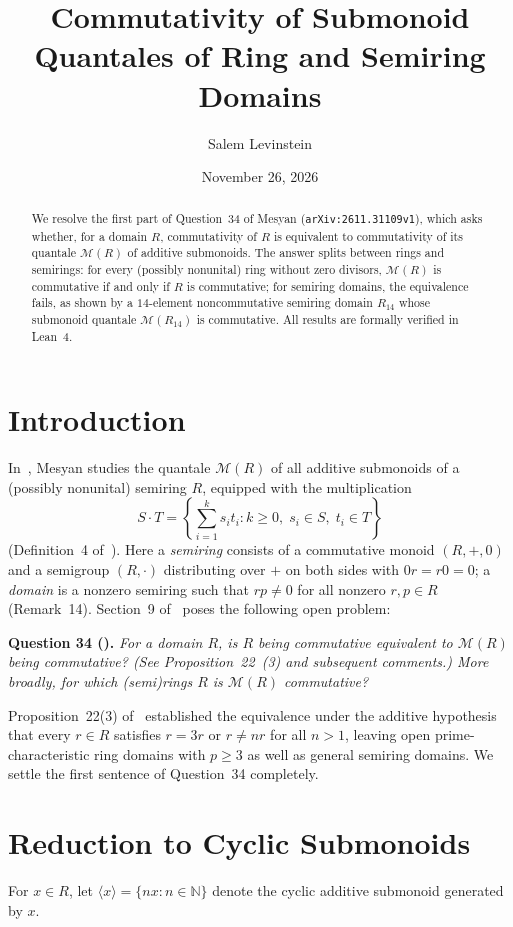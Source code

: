 \documentclass[11pt]{article}
\title{Commutativity of Submonoid Quantales of Ring and Semiring Domains}
\author{Salem Levinstein}
\date{November 26, 2026}
\theoremstyle{remark}
\begin{document}
\maketitle

\begin{abstract}
We resolve the first part of Question~34 of Mesyan (\texttt{arXiv:2611.31109v1}), which asks whether, for a domain $R$, commutativity of $R$ is equivalent to commutativity of its quantale $\mathcal{M}(R)$ of additive submonoids. The answer splits between rings and semirings: for every (possibly nonunital) ring without zero divisors, $\mathcal{M}(R)$ is commutative if and only if $R$ is commutative; for semiring domains, the equivalence fails, as shown by a $14$-element noncommutative semiring domain $R_{14}$ whose submonoid quantale $\mathcal{M}(R_{14})$ is commutative. All results are formally verified in Lean~4.
\end{abstract}

\section{Introduction}
In~\cite{Mesyan2026}, Mesyan studies the quantale $\mathcal{M}(R)$ of all additive submonoids of a (possibly nonunital) semiring $R$, equipped with the multiplication
\[
  S \cdot T = \left\{\sum_{i=1}^{k} s_i t_i : k \ge 0,\; s_i \in S,\; t_i \in T\right\}
\]
(Definition~4 of~\cite{Mesyan2026}). Here a \emph{semiring} consists of a commutative monoid $(R,+,0)$ and a semigroup $(R,\cdot)$ distributing over $+$ on both sides with $0r = r0 = 0$; a \emph{domain} is a nonzero semiring such that $rp \ne 0$ for all nonzero $r,p \in R$ (Remark~14). Section~9 of~\cite{Mesyan2026} poses the following open problem:

\medskip
\noindent\textbf{Question 34 (\cite{Mesyan2026}).} \emph{For a domain $R$, is $R$ being commutative equivalent to $\mathcal{M}(R)$ being commutative? (See Proposition~22~(3) and subsequent comments.) More broadly, for which (semi)rings $R$ is $\mathcal{M}(R)$ commutative?}
\medskip

Proposition~22(3) of~\cite{Mesyan2026} established the equivalence under the additive hypothesis that every $r \in R$ satisfies $r = 3r$ or $r \ne nr$ for all $n > 1$, leaving open prime-characteristic ring domains with $p \ge 3$ as well as general semiring domains. We settle the first sentence of Question~34 completely.

\section{Reduction to Cyclic Submonoids}
For $x \in R$, let $\langle x \rangle = \{nx : n \in \mathbb{N}\}$ denote the cyclic additive submonoid generated by $x$.
\end{document}
